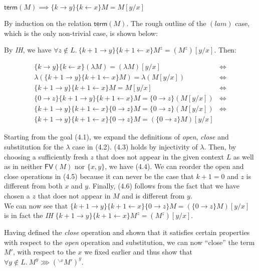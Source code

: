 \documentclass[a4paper, 12pt, twoside]{style/ociamthesis}
\makeatletter
\theoremstyle{plain}
\theoremstyle{definition}
\newtheorem{Lemma}{Lemma}[chapter]
\theoremstyle{remark}
\renewenvironment{proof}[1][\proofname]{\par
  \vspace{-\topsep}%
  \pushQED{\qed}%
  \normalfont
  \topsep0pt \partopsep0pt %
  \trivlist
  \item[\hskip\labelsep
        \itshape
    #1\@addpunct{.}]\ignorespaces
}{%
  \popQED\endtrivlist\@endpefalse
  \addvspace{6pt plus 6pt} %
}
\newcommand{\cls}{{}^{\backslash x}}
\newcommand{\trm}{\textsf{term}}
\newcommand{\fv}{\textsf{FV}}
\renewenvironment{Lemma}{\begin{OldLemma}\begin{mdframed}[style=example, linecolor=cyan]}{\end{mdframed}\end{OldLemma}}
\makeatother
\begin{document}
\begin{Lemma}

\(\trm(M) \implies \{k \to y\}\{k \leftarrow x\} M = M[y/x]\)
\label{Lemma:opnClsSubst}

\begin{proof}

By induction on the relation \(\trm(M)\). The rough outline of the
\((lam)\) case, which is the only non-trivial case, is shown below:

By \emph{IH}, we have
\(\forall z \not\in L.\ \{k+1 \to y\} \{k+1 \leftarrow x\} M^z = (M^z)[y/x]\).
Then:

\begin{align}
\{k \to y\} \{k \leftarrow x\} (\lambda M) = (\lambda M)[y/x] &\iff\\
\lambda(\{k+1 \to y\} \{k+1 \leftarrow x\} M) = \lambda (M[y/x])&\iff\\
\{k+1 \to y\} \{k+1 \leftarrow x\} M = M[y/x]&\iff\\
\{0 \to z\} \{k+1 \to y\} \{k+1 \leftarrow x\} M = \{0 \to z\} (M[y/x])&\iff\\
\{k+1 \to y\} \{k+1 \leftarrow x\} \{0 \to z\} M = \{0 \to z\} (M[y/x])&\iff\\
\{k+1 \to y\} \{k+1 \leftarrow x\} \{0 \to z\} M = (\{0 \to z\} M)[y/x]&
\end{align}

Starting from the goal (4.1), we expand the definitions of \emph{open},
\emph{close} and substitution for the \(\lambda\) case in (4.2). (4.3)
holds by injectivity of \(\lambda\). Then, by choosing a sufficiently
fresh \(z\) that does not appear in the given context \(L\) as well as
in neither \(\fv(M)\) nor \(\{x, y\}\), we have (4.4). We can reorder
the open and close operations in (4.5) because it can never be the case
that \(k+1 = 0\) and \(z\) is different from both \(x\) and \(y\).
Finally, (4.6) follows from the fact that we have chosen a \(z\) that
does not appear in \(M\) and is different from \(y\).\\
We can now see that
\(\{k+1 \to y\} \{k+1 \leftarrow x\} \{0 \to z\} M = (\{0 \to z\} M)[y/x]\)
is in fact the \emph{IH}
\(\{k+1 \to y\} \{k+1 \leftarrow x\} M^z = (M^z)[y/x]\).

\end{proof}

\end{Lemma}

Having defined the \emph{close} operation and shown that it satisfies
certain properties with respect to the \emph{open} operation and
substitution, we can now ``close'' the term \(M'\), with respect to the
\(x\) we fixed earlier and thus show that
\(\forall y \not\in L.\ M^y \ggg (\cls M')^y\).
\end{document}
